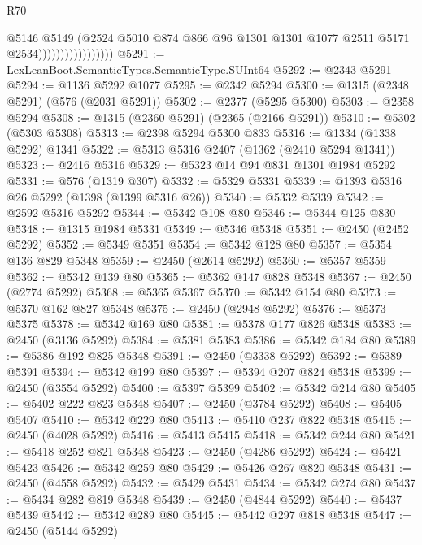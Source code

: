 \begin{lexlean}{R70}
\begin{coremodule}
                                    @5146
                                    @5149
                                    (@2524
                                      @5010
                                      @874
                                      @866
                                      @96
                                      @1301
                                      @1301
                                      @1077
                                      @2511
                                      @5171
                                      @2534)))))))))))))))))
@5291 := LexLeanBoot.SemanticTypes.SemanticType.SUInt64
@5292 := @2343 @5291
@5294 := @1136 @5292 @1077
@5295 := @2342 @5294
@5300 := @1315 (@2348 @5291) (@576 (@2031 @5291))
@5302 := @2377 (@5295 @5300)
@5303 := @2358 @5294
@5308 := @1315 (@2360 @5291) (@2365 (@2166 @5291))
@5310 := @5302 (@5303 @5308)
@5313 := @2398 @5294 @5300 @833
@5316 := @1334 (@1338 @5292) @1341
@5322 := @5313 @5316 @2407 (@1362 (@2410 @5294 @1341))
@5323 := @2416 @5316
@5329 := @5323 @14 @94 @831 @1301 @1984 @5292
@5331 := @576 (@1319 @307)
@5332 := @5329 @5331
@5339 := @1393 @5316 @26 @5292 (@1398 (@1399 @5316 @26))
@5340 := @5332 @5339
@5342 := @2592 @5316 @5292
@5344 := @5342 @108 @80
@5346 := @5344 @125 @830
@5348 := @1315 @1984 @5331
@5349 := @5346 @5348
@5351 := @2450 (@2452 @5292)
@5352 := @5349 @5351
@5354 := @5342 @128 @80
@5357 := @5354 @136 @829 @5348
@5359 := @2450 (@2614 @5292)
@5360 := @5357 @5359
@5362 := @5342 @139 @80
@5365 := @5362 @147 @828 @5348
@5367 := @2450 (@2774 @5292)
@5368 := @5365 @5367
@5370 := @5342 @154 @80
@5373 := @5370 @162 @827 @5348
@5375 := @2450 (@2948 @5292)
@5376 := @5373 @5375
@5378 := @5342 @169 @80
@5381 := @5378 @177 @826 @5348
@5383 := @2450 (@3136 @5292)
@5384 := @5381 @5383
@5386 := @5342 @184 @80
@5389 := @5386 @192 @825 @5348
@5391 := @2450 (@3338 @5292)
@5392 := @5389 @5391
@5394 := @5342 @199 @80
@5397 := @5394 @207 @824 @5348
@5399 := @2450 (@3554 @5292)
@5400 := @5397 @5399
@5402 := @5342 @214 @80
@5405 := @5402 @222 @823 @5348
@5407 := @2450 (@3784 @5292)
@5408 := @5405 @5407
@5410 := @5342 @229 @80
@5413 := @5410 @237 @822 @5348
@5415 := @2450 (@4028 @5292)
@5416 := @5413 @5415
@5418 := @5342 @244 @80
@5421 := @5418 @252 @821 @5348
@5423 := @2450 (@4286 @5292)
@5424 := @5421 @5423
@5426 := @5342 @259 @80
@5429 := @5426 @267 @820 @5348
@5431 := @2450 (@4558 @5292)
@5432 := @5429 @5431
@5434 := @5342 @274 @80
@5437 := @5434 @282 @819 @5348
@5439 := @2450 (@4844 @5292)
@5440 := @5437 @5439
@5442 := @5342 @289 @80
@5445 := @5442 @297 @818 @5348
@5447 := @2450 (@5144 @5292)

\end{coremodule}
\end{lexlean}
